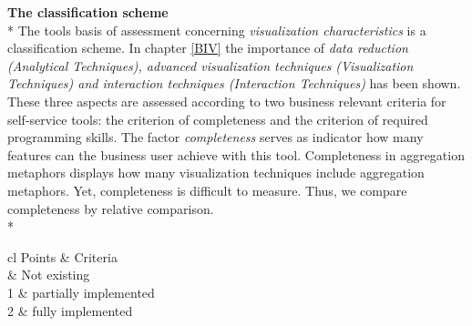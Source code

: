 \textbf{The classification scheme}\label{tool:classification}\\*
The tools basis of assessment concerning \textit{visualization characteristics} is a classification scheme. In chapter \ref{BIV} the importance of \textit{data reduction (Analytical Techniques), advanced visualization techniques (Visualization Techniques) and interaction techniques (Interaction Techniques)} has been shown. These three aspects are assessed according to two business relevant criteria for self-service tools: the criterion of completeness and the criterion of required programming skills. The factor \textit{completeness} serves as indicator how many features can the business user achieve with this tool. Completeness in aggregation metaphors displays how many visualization techniques include aggregation metaphors. Yet, completeness is difficult to measure. Thus, we compare completeness by relative comparison.\\*
\begin{table}[H]
	\caption[Tool Completeness]{Criteria Completeness: extend to which assessed aspect is implemented in tool}
	\label{programming-skills}
	\begin{tabu}{cl}
	\toprule
	Points & Criteria\\
	 & Not existing\\
	1 & partially implemented \\
	2 & fully implemented \\
	\bottomrule
	\end{tabu}
\end{table}

